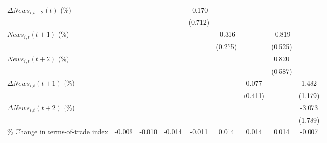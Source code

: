 {\begin{tabular}{l*{8}{c}}
\addlinespace
$ \Delta News_{i,t-2}(t)$ (\%)&                     &                     &                     &      -0.170         &                     &                     &                     &                     \\
                    &                     &                     &                     &     (0.712)         &                     &                     &                     &                     \\
\addlinespace
$ News_{i,t}(t+1)$ (\%)&                     &                     &                     &                     &      -0.316         &                     &      -0.819         &                     \\
                    &                     &                     &                     &                     &     (0.275)         &                     &     (0.525)         &                     \\
\addlinespace
$ News_{i,t}(t+2)$ (\%)&                     &                     &                     &                     &                     &                     &       0.820         &                     \\
                    &                     &                     &                     &                     &                     &                     &     (0.587)         &                     \\
\addlinespace
$ \Delta News_{i,t}(t+1)$ (\%)&                     &                     &                     &                     &                     &       0.077         &                     &       1.482         \\
                    &                     &                     &                     &                     &                     &     (0.411)         &                     &     (1.179)         \\
\addlinespace
$ \Delta News_{i,t}(t+2)$ (\%)&                     &                     &                     &                     &                     &                     &                     &      -3.073\sym{*}  \\
                    &                     &                     &                     &                     &                     &                     &                     &     (1.789)         \\
\addlinespace
\% Change in terms-of-trade index&      -0.008         &      -0.010         &      -0.014         &      -0.011         &       0.014         &       0.014         &       0.014         &      -0.007         \\

\end{tabular}}
